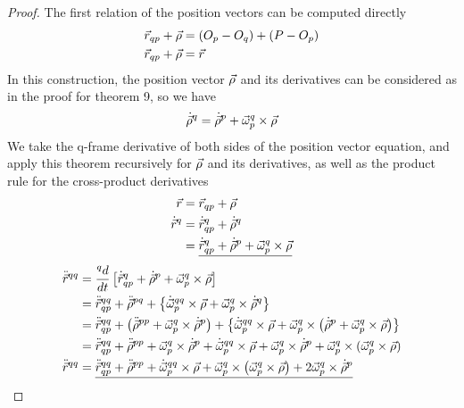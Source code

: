 \documentclass{article}
\begin{document}
\begin{proof}
    The first relation of the position vectors can be computed directly
    \begin{align*}
        \vec{r}_{qp} + \vec{\rho} &= (O_p-O_q) + (P-O_p) \\
        \vec{r}_{qp} + \vec{\rho} &= \vec{r}\\
    \end{align*}
    In this construction, the position vector $\vec{\rho}$ and its derivatives can be considered as in the proof for theorem 9, so we have
    $$\dot{\vec{\rho}}^q = \dot{\vec{\rho}}^p + \vec{\omega}_p^q\times\vec{\rho}$$
    We take the q-frame derivative of both sides of the position vector equation, and apply this theorem recursively for $\vec{\rho}$ and its derivatives, as well as the product rule for the cross-product derivatives
    \begin{align*}
        \vec{r} &= \vec{r}_{qp} + \vec{\rho}  \\
        \dot{\vec{r}}^q &= \dot{\vec{r}}_{qp}^q + \dot{\vec{\rho}}^q \\
        &= \underline{\dot{\vec{r}}_{qp}^q + \dot{\vec{\rho}}^p + \vec{\omega}_p^q\times\vec{\rho}}\\
    \end{align*}
    \begin{align*}
        \ddot{\vec{r}}^{qq} &= \frac{{}^qd}{dt}\left[ \dot{\vec{r}}_{qp}^q + \dot{\vec{\rho}}^p + \vec{\omega}_p^q\times\vec{\rho} \right]\\
        &= \ddot{\vec{r}}_{qp}^{qq} + \ddot{\vec{\rho}}^{pq} +\left\{\dot{\vec{\omega}}_p^{qq}\times\vec{\rho}+\vec{\omega}_p^q\times\dot{\vec{\rho}}^q\right\}\\
        &= \ddot{\vec{r}}_{qp}^{qq} + \left(\ddot{\vec{\rho}}^{pp}+\vec{\omega}_p^q\times\dot{\vec{\rho}}^p\right) + \left\{ \dot{\vec{\omega}}_p^{qq}\times\vec{\rho} + \vec{\omega}_p^q \times \left(\dot{\vec{\rho}}^p + \vec{\omega}_p^q\times\vec{\rho}\right)\right\}\\
        &=\ddot{\vec{r}}_{qp}^{qq} + \ddot{\vec{\rho}}^{pp}+\vec{\omega}_p^q\times\dot{\vec{\rho}}^p + \dot{\vec{\omega}}_p^{qq}\times\vec{\rho} + \vec{\omega}_p^q\times\dot{\vec{\rho}}^p + \vec{\omega}_p^q\times(\vec{\omega}_p^q\times\vec{\rho}) \\
        \ddot{\vec{r}}^{qq}&= \underline{\ddot{\vec{r}}_{qp}^{qq} + \ddot{\vec{\rho}}^{pp} + \dot{\vec{\omega}}_p^{qq}\times\vec{\rho} + \vec{\omega}_p^q\times \left(\vec{\omega}_p^q\times\vec{\rho}\right)+2\vec{\omega}_p^q\times \dot{\vec{\rho}}^p}
    \end{align*}
    
    
\end{proof}
\end{document}
